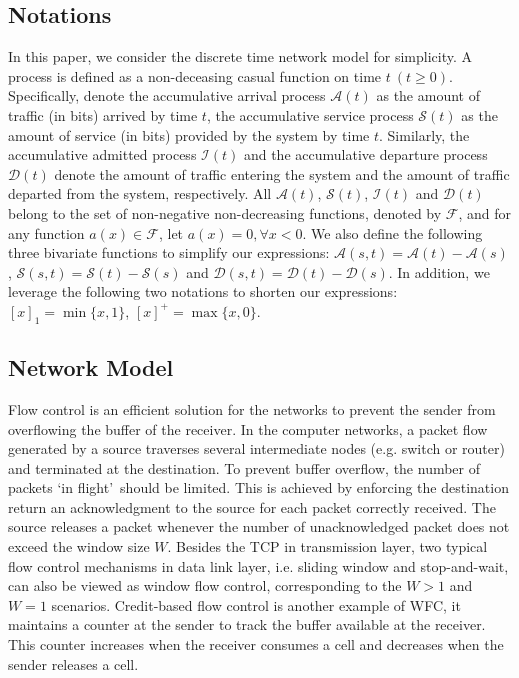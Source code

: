 \documentclass[12pt]{article}
\begin{document}
\subsection{Notations}\label{notation}
In this paper, we consider the discrete time network model for simplicity. A process is defined as a non-deceasing casual function on time $t\ (t\geq 0)$. Specifically, denote the accumulative arrival process $\mathcal{A}(t)$ as the amount of traffic (in bits) arrived by time $t$, the accumulative service process $\mathcal{S}(t)$ as the amount of service (in bits) provided by the system by time $t$. Similarly, the accumulative admitted process $\mathcal{I}(t)$ and the accumulative departure process $\mathcal{D}(t)$ denote the amount of traffic entering the system and the amount of traffic departed from the system, respectively. All $\mathcal{A}(t)$, $\mathcal{S}(t)$, $\mathcal{I}(t)$ and $\mathcal{D}(t)$ belong to the set of non-negative non-decreasing functions, denoted by $\mathcal{F}$, and for any function $a(x)\in\mathcal{F}$, let $a(x)=0,\forall x<0$. We also define the following three bivariate functions to simplify our expressions: $\mathcal{A}(s,t)=\mathcal{A}(t)-\mathcal{A}(s)$, $\mathcal{S}(s,t)=\mathcal{S}(t)-\mathcal{S}(s)$ and $\mathcal{D}(s,t)=\mathcal{D}(t)-\mathcal{D}(s)$. In addition, we leverage the following two notations to shorten our expressions: $[x]_1=\min\{x,1\}$, $[x]^+=\max\{x,0\}$.

\subsection{Network Model}\label{model}
Flow control is an efficient solution for the networks to prevent the sender from overflowing the buffer of the receiver. In the computer networks, a packet flow generated by a source traverses several intermediate nodes (e.g. switch or router) and terminated at the destination. To prevent buffer overflow, the number of packets \textquoteleft in flight\textquoteright\ should be limited. This is achieved by enforcing the destination return an acknowledgment to the source for each packet correctly received. The source releases a packet whenever the number of unacknowledged packet does not exceed the window size $W$. Besides the TCP \cite{RFC5681} in transmission layer, two typical flow control mechanisms in data link layer, i.e. sliding window and stop-and-wait, can also be viewed as window flow control, corresponding to the $W>1$ and $W=1$ scenarios. Credit-based flow control is another example of WFC, it maintains a counter at the sender to track the buffer available at the receiver. This counter increases when the receiver consumes a cell and decreases when the sender releases a cell.
\end{document}
